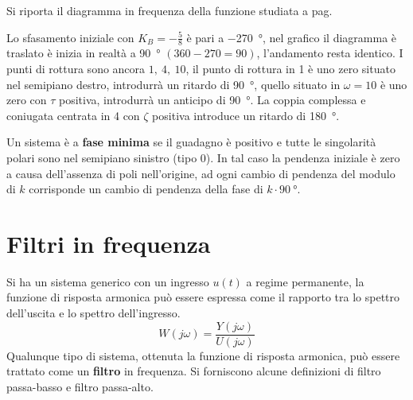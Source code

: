 \newpage
Si riporta il diagramma in frequenza della funzione studiata a pag.
\pageref{sec:Esercizio_bode}
\begin{figure}[h]
\centering
{}
\end{figure}

Lo sfasamento iniziale con $K_B=-\frac{5}{8}$ è pari a \SI{-270}{\degree}, nel
grafico il diagramma è traslato è inizia in realtà a \SI{90}{\degree}
$(360-270=90)$, l'andamento resta identico. I punti di rottura sono ancora $1,\
4,\ 10$, il punto di rottura in 1 è uno zero situato nel semipiano destro,
introdurrà un ritardo di \SI{90}{\degree}, quello situato in $\omega=10$ è uno
zero con $\tau$ positiva, introdurrà un anticipo di \SI{90}{\degree}.
La coppia complessa e coniugata centrata in 4 con $\zeta$ positiva introduce un
ritardo di \SI{180}{\degree}.

Un sistema è a \textbf{fase minima} se il guadagno è positivo e tutte le
singolarità polari sono nel semipiano sinistro (tipo 0).
In tal caso la pendenza iniziale è zero a causa dell'assenza di poli
nell'origine, ad ogni cambio di pendenza del modulo di $k$ corrisponde un
cambio di pendenza della fase di $k\cdot\SI{90}{\degree}$.

\newpage
\section{Filtri in frequenza}
Si ha un sistema generico con un ingresso $u(t)$ a regime permanente, la
funzione di risposta armonica può essere espressa come il rapporto tra lo
spettro dell'uscita e lo spettro dell'ingresso.
$$
W(j\omega) = \frac{Y(j\omega)}{U(j\omega)}
$$
Qualunque tipo di sistema, ottenuta la funzione di risposta armonica, può
essere trattato come un \textbf{filtro} in frequenza.
Si forniscono alcune definizioni di filtro passa-basso e filtro passa-alto.

